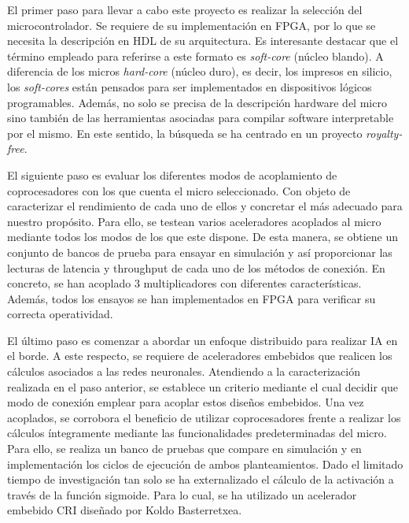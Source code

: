 El primer paso para llevar a cabo este proyecto es realizar la selección del microcontrolador.
Se requiere de su implementación en FPGA, por lo que se necesita la descripción en HDL de su arquitectura.
Es interesante destacar que el término empleado para referirse a este formato es \textit{soft-core} (núcleo blando).
A diferencia de los micros \textit{hard-core} (núcleo duro), es decir, los impresos en silicio, los \textit{soft-cores} están pensados para ser implementados en dispositivos lógicos programables. 
Además, no solo se precisa de la descripción hardware del micro sino también de las herramientas asociadas para compilar software interpretable por el mismo.
En este sentido, la búsqueda se ha centrado en un proyecto \textit{royalty-free}.

El siguiente paso es evaluar los diferentes modos de acoplamiento de coprocesadores con los que cuenta el micro seleccionado.
Con objeto de caracterizar el rendimiento de cada uno de ellos y concretar el más adecuado para nuestro propósito.
Para ello, se testean varios aceleradores acoplados al micro mediante todos los modos de los que este dispone.
De esta manera, se obtiene un conjunto de bancos de prueba para ensayar en simulación y así proporcionar las lecturas de latencia y throughput de cada uno de los métodos de conexión.
En concreto, se han acoplado 3 multiplicadores con diferentes características.
Además, todos los ensayos se han implementados en FPGA para verificar su correcta operatividad.

El último paso es comenzar a abordar un enfoque distribuido para realizar IA en el borde. 
A este respecto, se requiere de aceleradores embebidos que realicen los cálculos asociados a las redes neuronales.
Atendiendo a la caracterización realizada en el paso anterior, se establece un criterio mediante el cual decidir que modo de conexión emplear para acoplar estos diseños embebidos.
Una vez acoplados, se corrobora el beneficio de utilizar coprocesadores frente a realizar los cálculos íntegramente mediante las funcionalidades predeterminadas del micro.
Para ello, se realiza un banco de pruebas que compare en simulación y en implementación los ciclos de ejecución de ambos planteamientos.
Dado el limitado tiempo de investigación tan solo se ha externalizado el cálculo de la activación a través de la función sigmoide.
Para lo cual, se ha utilizado un acelerador embebido CRI diseñado por Koldo Basterretxea.

